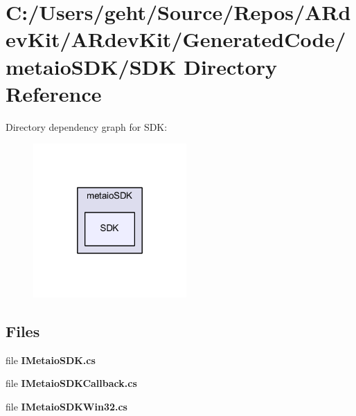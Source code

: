 \section{C\-:/\-Users/geht/\-Source/\-Repos/\-A\-Rdev\-Kit/\-A\-Rdev\-Kit/\-Generated\-Code/metaio\-S\-D\-K/\-S\-D\-K Directory Reference}
\label{dir_33fcdc3d6b81c65e5e8af37f1a484675}
Directory dependency graph for S\-D\-K\-:
\nopagebreak
\begin{figure}[H]
\begin{center}
\leavevmode
\includegraphics[width=166pt]{dir_33fcdc3d6b81c65e5e8af37f1a484675_dep}
\end{center}
\end{figure}
\subsection*{Files}
\begin{DoxyCompactItemize}
\item 
file {\bfseries I\-Metaio\-S\-D\-K.\-cs}
\item 
file {\bfseries I\-Metaio\-S\-D\-K\-Callback.\-cs}
\item 
file {\bfseries I\-Metaio\-S\-D\-K\-Win32.\-cs}
\end{DoxyCompactItemize}
